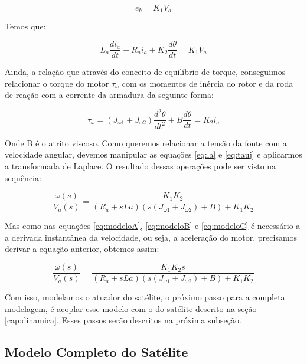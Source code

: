 \begin{equation}
  e_b = K_1V_a
\end{equation}

Temos que:

\begin{equation}\label{eq:la}
L_a \frac{di_a}{dt}+R_a i_a + K_2\frac{d\theta}{dt} = K_1V_a
\end{equation}

Ainda, a relação que através do conceito de equilíbrio de torque, conseguimos relacionar o torque do motor $\tau_{\omega}$ com os momentos de inércia do rotor e da roda de reação com a corrente da armadura da seguinte forma:

\begin{equation}\label{eq:tauj}
\tau_{\omega} = (J_{\omega 1} + J_{\omega 2})\frac{d^{2}\theta}{dt^{2}}+B\frac{d\theta}{dt} = K_2 i_a
\end{equation}

Onde B é o atrito viscoso. Como queremos relacionar a tensão da fonte com a velocidade angular, devemos manipular as equações \ref{eq:la} e \ref{eq:tauj} e aplicarmos a transformada de Laplace. O resultado dessas operações pode ser visto na sequência: 

\begin{equation}
  \frac{\omega(s)}{V_a(s)} = \frac{K_1K_2}{(R_a+ sLa)(s(J_{\omega 1} + J_{\omega 2})+B)+K_1K_2}  
\end{equation}

Mas como nas equações \ref{eq:modeloA}, \ref{eq:modeloB} e \ref{eq:modeloC} é necessário a a derivada instantânea da velocidade, ou seja, a aceleração do motor, precisamos derivar a equação anterior, obtemos assim:

\begin{equation}
  \frac{\dot{\omega}(s)}{V_a(s)} = \frac{K_1K_2 s}{(R_a+ sLa)(s(J_{\omega 1} + J_{\omega 2})+B)+K_1K_2}  
\end{equation}

Com isso, modelamos o atuador do satélite, o próximo passo para a completa modelagem, é acoplar esse modelo com o do satélite descrito na seção \ref{cap:dinamica}. Esses passos serão descritos na próxima subseção.



\subsection{Modelo Completo do Satélite}

